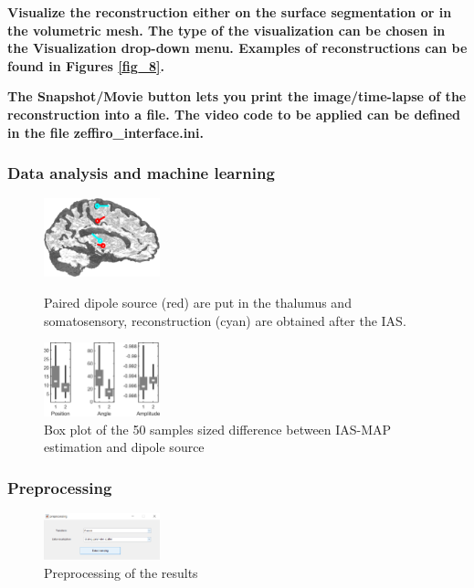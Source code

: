 \documentclass[5p]{elsarticle}
\begin{document}
\begin{frontmatter}
\bf Visualize the reconstruction either on the surface segmentation or in the volumetric mesh. The type of the visualization can be chosen in the Visualization drop-down menu. Examples of reconstructions can be found in Figures \ref{fig_8}.



\bf The Snapshot/Movie button lets you print the image/time-lapse of the reconstruction into a file. The video code to be applied can be defined in the file zeffiro\_interface.ini.

\subsubsection {Data analysis and machine learning}

\begin{figure}[h!]
  \begin{minipage}
  \begin{center}
    \includegraphics[width=0.3\textwidth]{19_1&2_0.02_inverse_5_eeg.png}
  \end{center}
  \caption{Paired dipole source (red) are put in the thalumus and somatosensory, reconstruction (cyan) are obtained after the IAS.}
  \end{minipage}
  \begin{minipage}
  \begin{center}
    \includegraphics[width=0.3\textwidth]{thalamus_source42.png}
  \end{center}
  \caption{Box plot of the 50 samples sized difference between IAS-MAP estimation and dipole source}
  \end{minipage}
  \label{fig_9}  
\end{figure}

\subsubsection{Preprocessing}
\begin{figure}[h!]
  \begin{center}
    \includegraphics[width=0.3\textwidth]{preprocessing.PNG}
  \end{center}
  \caption{Preprocessing of the results}
  \label{fig_10}
\end{figure}



\end{frontmatter}
\end{document}
